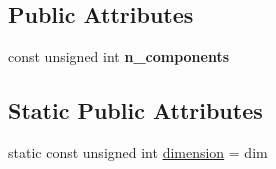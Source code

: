 \subsection*{Public Attributes}
\begin{DoxyCompactItemize}
\item 
\mbox{\label{classLaplaceBEM_1_1KernelPulledbackToUnitCell_ad351c9674e4bd484e5d5396210abe282}} 
const unsigned int {\bfseries n\+\_\+components}
\end{DoxyCompactItemize}
\subsection*{Static Public Attributes}
\begin{DoxyCompactItemize}
\item 
static const unsigned int \hyperlink{classLaplaceBEM_1_1KernelPulledbackToUnitCell_a03ac8378093fac9ad01272ef619aa26e}{dimension} = dim
\end{DoxyCompactItemize}
